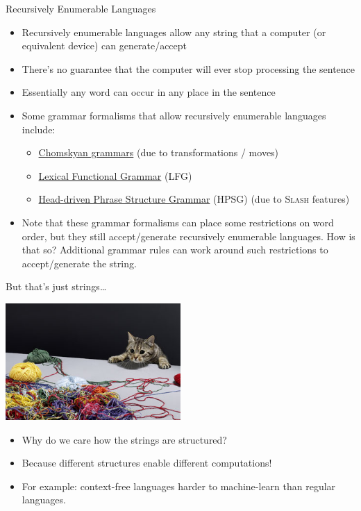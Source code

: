\documentclass{beamer}
\begin{document}
\begin{frame}{Recursively Enumerable Languages}
\begin{itemize}
	\item Recursively enumerable languages allow any string that a computer (or equivalent device) can generate/accept
	\item There's no guarantee that the computer will ever stop processing the sentence
	\item Essentially any word can occur in any place in the sentence
	\pause
	\item Some grammar formalisms that allow recursively enumerable languages include:
	\begin{itemize}
		\item \href{https://en.wikipedia.org/wiki/Transformational_grammar}{Chomskyan grammars} (due to transformations / moves)
		\item \href{https://en.wikipedia.org/wiki/Lexical_functional_grammar}{Lexical Functional Grammar} (LFG)
		\item \href{https://en.wikipedia.org/wiki/Head-driven_phrase_structure_grammar}{Head-driven Phrase Structure Grammar} (HPSG) (due to \textsc{Slash} features)
	\end{itemize}
	\pause
	\item Note that these grammar formalisms can place some restrictions on word order, but they still accept/generate recursively enumerable languages. \pause How is that so? \pause Additional grammar rules can work around such restrictions to accept/generate the string.
\end{itemize}
\end{frame}

\begin{frame}{But that's just strings\ldots}
  \begin{center}
    \href{http://science.howstuffworks.com/science-vs-myth/everyday-myths/string-theory.htm}{\includegraphics[width=0.5\textwidth]{images/string-theory.jpg}}
  \end{center}\pause
  \begin{itemize}
  \item Why do we care how the strings are structured?\pause
  \item Because different structures enable different computations!\pause
  \item For example: context-free languages harder to machine-learn than regular languages.
  \end{itemize}
\end{frame}
\end{document}
